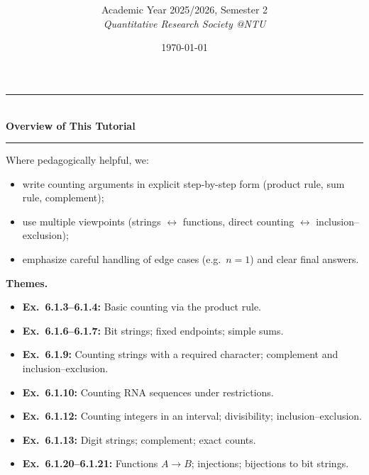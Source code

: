 \documentclass[12pt]{article}
\title{
\CourseCode \CourseName \\[0.3em]
\large \DocType
}
\author{
  Academic Year 2025/2026, Semester 2 \\[0.25em]
  \textit{Quantitative Research Society @NTU}
}
\date{\today}
\begin{document}
\maketitle
\thispagestyle{plainfirst}
\pagestyle{main}

\bigskip


\begin{center}
\rule{0.8\textwidth}{0.4pt}\\[4pt]
\textbf{Overview of This Tutorial}\\[2pt]
\rule{0.8\textwidth}{0.4pt}
\end{center}

\noindent
Where pedagogically helpful, we:
\begin{itemize}[leftmargin=*]
\item write counting arguments in explicit step-by-step form (product rule, sum rule, complement);
\item use multiple viewpoints (strings $\leftrightarrow$ functions, direct counting $\leftrightarrow$ inclusion--exclusion);
\item emphasize careful handling of edge cases (e.g.\ $n=1$) and clear final answers.
\end{itemize}

\noindent
\textbf{Themes.}
\begin{itemize}[leftmargin=*]
\item \textbf{Ex.\ 6.1.3--6.1.4:} Basic counting via the product rule.
\item \textbf{Ex.\ 6.1.6--6.1.7:} Bit strings; fixed endpoints; simple sums.
\item \textbf{Ex.\ 6.1.9:} Counting strings with a required character; complement and inclusion--exclusion.
\item \textbf{Ex.\ 6.1.10:} Counting RNA sequences under restrictions.
\item \textbf{Ex.\ 6.1.12:} Counting integers in an interval; divisibility; inclusion--exclusion.
\item \textbf{Ex.\ 6.1.13:} Digit strings; complement; exact counts.
\item \textbf{Ex.\ 6.1.20--6.1.21:} Functions $A\to B$; injections; bijections to bit strings.
\end{itemize}

\newpage
\tableofcontents
\newpage
\end{document}
